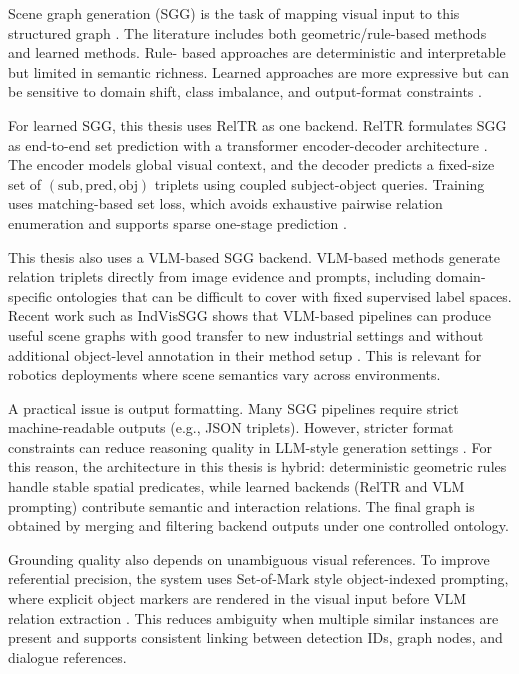 Scene graph generation (SGG) is the task of mapping visual input to this structured graph \cite{zhu_scene_2022}. The literature includes both geometric/rule-based methods and learned methods. Rule-
based approaches are deterministic and interpretable but limited in semantic richness. Learned approaches are more expressive but can be sensitive to domain shift, class imbalance, and output-format
constraints \cite{zhu_scene_2022}.

For learned SGG, this thesis uses RelTR as one backend. RelTR formulates SGG as end-to-end set prediction with a transformer encoder-decoder architecture \cite{cong_reltr_2023}. The encoder models
global visual context, and the decoder predicts a fixed-size set of \((\text{sub},\text{pred},\text{obj})\) triplets using coupled subject-object queries. Training uses matching-based set loss, which
avoids exhaustive pairwise relation enumeration and supports sparse one-stage prediction \cite{cong_reltr_2023}.

This thesis also uses a VLM-based SGG backend. VLM-based methods generate relation triplets directly from image evidence and prompts, including domain-specific ontologies that can be difficult to cover
with fixed supervised label spaces. Recent work such as IndVisSGG shows that VLM-based pipelines can produce useful scene graphs with good transfer to new industrial settings and without additional
object-level annotation in their method setup \cite{wang_indvissgg_2025}. This is relevant for robotics deployments where scene semantics vary across environments.

A practical issue is output formatting. Many SGG pipelines require strict machine-readable outputs (e.g., JSON triplets). However, stricter format constraints can reduce reasoning quality in LLM-style
generation settings \cite{tam_let_2024}. For this reason, the architecture in this thesis is hybrid: deterministic geometric rules handle stable spatial predicates, while learned backends (RelTR and
VLM prompting) contribute semantic and interaction relations. The final graph is obtained by merging and filtering backend outputs under one controlled ontology.

Grounding quality also depends on unambiguous visual references. To improve referential precision, the system uses Set-of-Mark style object-indexed prompting, where explicit object markers are rendered
in the visual input before VLM relation extraction \cite{yang_set-of-mark_2023}. This reduces ambiguity when multiple similar instances are present and supports consistent linking between detection
IDs, graph nodes, and dialogue references.

